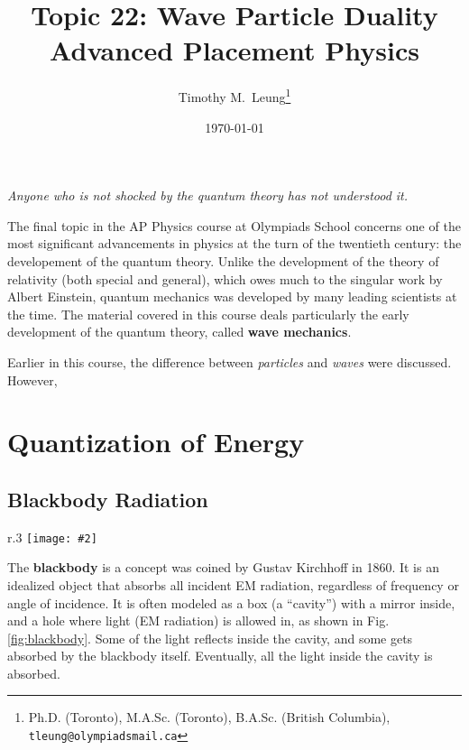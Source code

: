 \documentclass[11pt]{article}
\title{Topic 22: Wave Particle Duality\\Advanced Placement Physics}
\author{Timothy M.\ Leung\thanks{Ph.D. (Toronto), M.A.Sc. (Toronto), B.A.Sc.
    (British Columbia), \texttt{tleung@olympiadsmail.ca}}}
\affil{Olympiads School\\Toronto, Ontario, Canada}
\date{\today}
\newcommand{\pic}[2]{\texttt{[image: \#2]}}
\begin{document}
\vspace{-2.5in}\maketitle



\begin{center}
  \begin{minipage}{.8\linewidth}
    \emph{Anyone who is not shocked by the quantum theory has not understood
      it.}
  
  \end{minipage}
\end{center}
The final topic in the AP Physics course at Olympiads School concerns one of
the most significant advancements in physics at the turn of the twentieth
century: the developement of the quantum theory. Unlike the development of the
theory of relativity (both special and general), which owes much to the
singular work by Albert Einstein, quantum mechanics was developed by many
leading scientists at the time. The material covered in this course deals
particularly the early development of the quantum theory, called
\textbf{wave mechanics}.

Earlier in this course, the difference between \emph{particles} and \emph{waves}
were discussed. However, 


\section{Quantization of Energy}

\subsection{Blackbody Radiation}

\begin{wrapfigure}{r}{.3\textwidth}%
  \centering
  \pic{.3}{800px-Black_body_realization.png}
  \caption{A blackbody}
  \label{fig:blackbody}
\end{wrapfigure}
The \textbf{blackbody} is a concept was coined by Gustav Kirchhoff in 1860. It
is an idealized object that absorbs all incident EM radiation, regardless of
frequency or angle of incidence. It is often modeled as a box (a ``cavity'')
with a mirror inside, and a hole where light (EM radiation) is allowed in, as
shown in Fig.\ref{fig:blackbody}. Some of the light reflects inside the cavity,
and some gets absorbed by the blackbody itself. Eventually, all the light
inside the cavity is absorbed.
\end{document}
